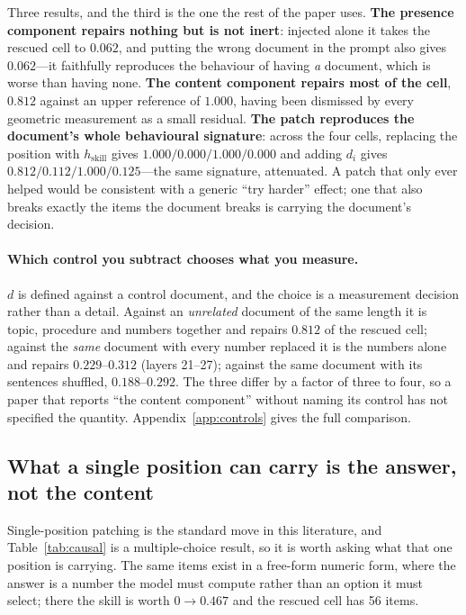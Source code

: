 \documentclass{article}
\newcommand{\dvec}{\ensuremath{d}}
\begin{document}
Three results, and the third is the one the rest of the paper uses.
\textbf{The presence component repairs nothing but is not inert}: injected
alone it takes the rescued cell to $0.062$, and putting the wrong document in
the prompt also gives $0.062$---it faithfully reproduces the behaviour of having
\emph{a} document, which is worse than having none. \textbf{The content
component repairs most of the cell}, $0.812$ against an upper reference of
$1.000$, having been dismissed by every geometric measurement as a small
residual. \textbf{The patch reproduces the document's whole behavioural
signature}: across the four cells, replacing the position with
$h_{\text{skill}}$ gives $1.000 / 0.000 / 1.000 / 0.000$ and adding $\dvec_i$
gives $0.812 / 0.112 / 1.000 / 0.125$---the same signature, attenuated. A patch
that only ever helped would be consistent with a generic ``try harder'' effect;
one that also breaks exactly the items the document breaks is carrying the
document's decision.

\paragraph{Which control you subtract chooses what you measure.} $\dvec$ is
defined against a control document, and the choice is a measurement decision
rather than a detail. Against an \emph{unrelated} document of the same length it
is topic, procedure and numbers together and repairs $0.812$ of the rescued
cell; against the \emph{same} document with every number replaced it is the
numbers alone and repairs $0.229$--$0.312$ (layers 21--27); against the same
document with its sentences shuffled, $0.188$--$0.292$. The three differ by a
factor of three to four, so a paper
that reports ``the content component'' without naming its control has not
specified the quantity. Appendix~\ref{app:controls} gives the full comparison.

\subsection{What a single position can carry is the answer, not the content}


Single-position patching is the standard move in this literature, and
Table~\ref{tab:causal} is a multiple-choice result, so it is worth asking what
that one position is carrying. The same items exist in a free-form numeric form,
where the answer is a number the model must compute rather than an option it
must select; there the skill is worth $0 \to 0.467$ and the rescued cell has 56
items.
\end{document}
